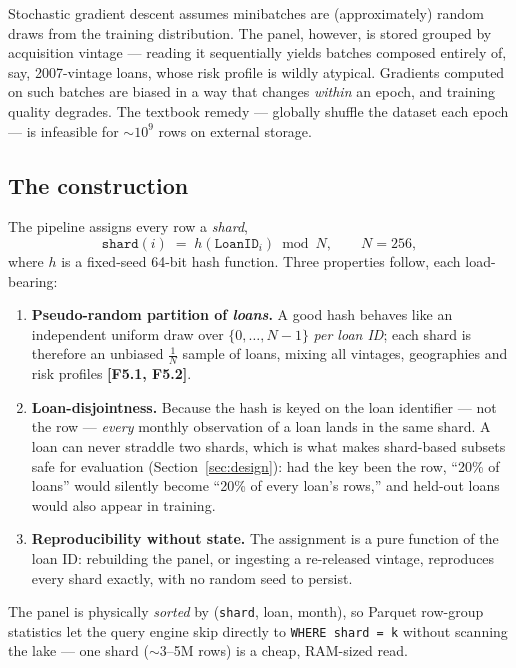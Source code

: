 \documentclass[11pt,a4paper]{article}
\newcommand{\code}[1]{\texttt{#1}}
\newcommand{\artifact}[1]{\textbf{[#1]}}
\begin{document}
Stochastic gradient descent assumes minibatches are (approximately) random draws from the training distribution. The panel, however, is stored grouped by acquisition vintage --- reading it sequentially yields batches composed entirely of, say, 2007-vintage loans, whose risk profile is wildly atypical. Gradients computed on such batches are biased in a way that changes \emph{within} an epoch, and training quality degrades. The textbook remedy --- globally shuffle the dataset each epoch --- is infeasible for $\sim$$10^9$ rows on external storage.

\subsection{The construction}

The pipeline assigns every row a \emph{shard},
\begin{equation}
\label{eq:shard}
\code{shard}(i) \;=\; h\!\left(\code{LoanID}_i\right) \bmod N, \qquad N=256,
\end{equation}
where $h$ is a fixed-seed 64-bit hash function. Three properties follow, each load-bearing:

\begin{enumerate}[itemsep=2pt]
\item \textbf{Pseudo-random partition of \emph{loans}.} A good hash behaves like an independent uniform draw over $\{0,\dots,N-1\}$ \emph{per loan ID}; each shard is therefore an unbiased $\tfrac1N$ sample of loans, mixing all vintages, geographies and risk profiles \artifact{F5.1, F5.2}.
\item \textbf{Loan-disjointness.} Because the hash is keyed on the loan identifier --- not the row --- \emph{every} monthly observation of a loan lands in the same shard. A loan can never straddle two shards, which is what makes shard-based subsets safe for evaluation (Section~\ref{sec:design}): had the key been the row, ``20\% of loans'' would silently become ``20\% of every loan's rows,'' and held-out loans would also appear in training.
\item \textbf{Reproducibility without state.} The assignment is a pure function of the loan ID: rebuilding the panel, or ingesting a re-released vintage, reproduces every shard exactly, with no random seed to persist.
\end{enumerate}

The panel is physically \emph{sorted} by (\code{shard}, loan, month), so Parquet row-group statistics let the query engine skip directly to \code{WHERE shard = k} without scanning the lake --- one shard ($\sim$3--5M rows) is a cheap, RAM-sized read.
\end{document}
